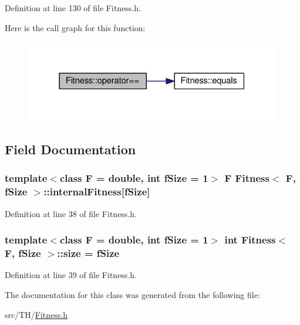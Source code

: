 Definition at line 130 of file Fitness.\+h.



Here is the call graph for this function\+:
\nopagebreak
\begin{figure}[H]
\begin{center}
\leavevmode
\includegraphics[width=316pt]{structFitness_a525bb798a0016fada60e60a601c46510_cgraph}
\end{center}
\end{figure}




\subsection{Field Documentation}
\subsubsection[{\texorpdfstring{internal\+Fitness}{internalFitness}}]{\setlength{\rightskip}{0pt plus 5cm}template$<$class F = double, int f\+Size = 1$>$ F {\bf Fitness}$<$ F, f\+Size $>$\+::internal\+Fitness\mbox{[}f\+Size\mbox{]}}\hypertarget{structFitness_abffc9af3988e39e82dc81fc006e6ef4a}{}\label{structFitness_abffc9af3988e39e82dc81fc006e6ef4a}


Definition at line 38 of file Fitness.\+h.

\subsubsection[{\texorpdfstring{size}{size}}]{\setlength{\rightskip}{0pt plus 5cm}template$<$class F = double, int f\+Size = 1$>$ int {\bf Fitness}$<$ F, f\+Size $>$\+::size = f\+Size}\hypertarget{structFitness_ab487af790e21882d9308356e9b8fbf0d}{}\label{structFitness_ab487af790e21882d9308356e9b8fbf0d}


Definition at line 39 of file Fitness.\+h.



The documentation for this class was generated from the following file\+:\begin{DoxyCompactItemize}
\item 
src/\+T\+H/\hyperlink{Fitness_8h}{Fitness.\+h}\end{DoxyCompactItemize}

